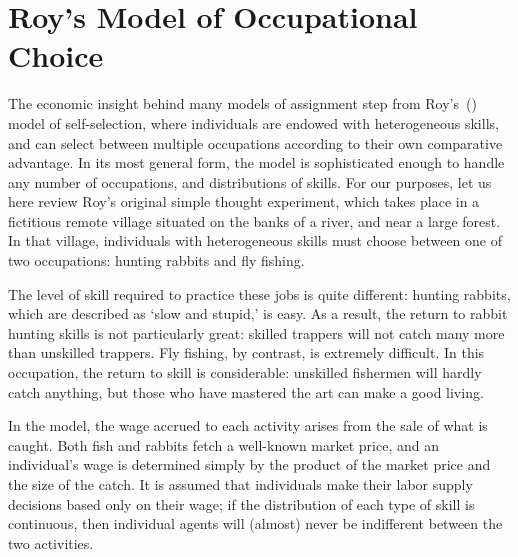 \section{Roy's Model of Occupational Choice}

The economic insight behind many models of assignment step from Roy's~(\citeyear{Roy1951}) model of self-selection, where individuals are endowed with heterogeneous skills, and can select between multiple occupations according to their own comparative advantage. In its most general form, the model is sophisticated enough to handle any number of occupations, and distributions of skills. For our purposes, let us here review Roy's original simple thought experiment, which takes place in a fictitious remote village situated on the banks of a river, and near a large forest. In that village, individuals with heterogeneous skills must choose between one of two occupations: hunting rabbits and fly fishing. 

The level of skill required to practice these jobs is quite different: hunting rabbits, which are described as `slow and stupid,' is easy. As a result, the return to rabbit hunting skills is not particularly great: skilled trappers will not catch many more than unskilled trappers. Fly fishing, by contrast, is extremely difficult. In this occupation, the return to skill is considerable: unskilled fishermen will hardly catch anything, but those who have mastered the art can make a good living.

In the model, the wage accrued to each activity arises from the sale of what is caught. Both fish and rabbits fetch a well-known market price, and an individual's wage is determined simply by the product of the market price and the size of the catch. It is assumed that individuals make their labor supply decisions based only on their wage; if the distribution of each type of skill is continuous, then individual agents will (almost) never be indifferent between the two activities.

